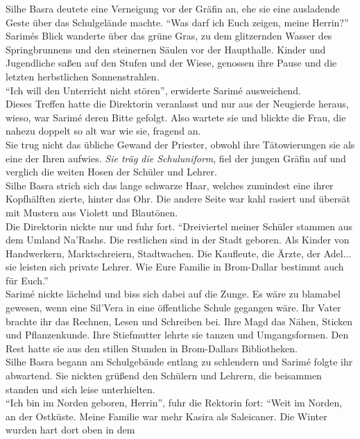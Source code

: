 Silhe Basra deutete eine Verneigung vor der Gräfin an, ehe sie eine ausladende Geste über das 
Schulgelände machte. ``Was darf ich Euch zeigen, meine Herrin?''\\
Sarimés Blick wanderte über das grüne Gras, zu dem glitzernden Wasser des Springbrunnens und den 
steinernen Säulen vor der Haupthalle. Kinder und Jugendliche saßen auf den Stufen und der Wiese, 
genossen ihre Pause und die letzten herbstlichen Sonnenstrahlen.\\
``Ich will den Unterricht nicht stören'', erwiderte Sarimé ausweichend.\\
Dieses Treffen hatte die Direktorin veranlasst und nur aus der Neugierde heraus, wieso, war Sarimé 
deren Bitte gefolgt. Also wartete sie und blickte die Frau, die nahezu doppelt so alt war wie sie, 
fragend an.\\
Sie trug nicht das übliche Gewand der Priester, obwohl ihre Tätowierungen sie als eine der Ihren 
aufwies. \textit{Sie träg die Schuluniform}, fiel der jungen Gräfin auf und verglich die weiten 
Hosen der Schüler und Lehrer.\\
Silhe Basra strich sich das lange schwarze Haar, welches zumindest eine ihrer Kopfhälften zierte, 
hinter das Ohr. Die andere Seite war kahl rasiert und übersät mit Mustern aus Violett und 
Blautönen.\\
Die Direktorin nickte nur und fuhr fort. ``Dreiviertel meiner Schüler stammen aus dem Umland 
Na'Rashs. Die restlichen sind in der Stadt geboren. Als Kinder von Handwerkern, Marktschreiern, 
Stadtwachen. Die Kaufleute, die Ärzte, der Adel... sie leisten sich private Lehrer. Wie Eure 
Familie in Brom-Dallar bestimmt auch für Euch.''\\
Sarimé nickte lächelnd und biss sich dabei auf die Zunge. Es wäre zu blamabel gewesen, wenn eine 
Sil'Vera in eine öffentliche Schule gegangen wäre. Ihr Vater brachte ihr das Rechnen, Lesen und 
Schreiben bei. Ihre Magd das Nähen, Sticken und Pflanzenkunde. Ihre Stiefmutter lehrte sie 
tanzen und Umgangsformen. Den Rest hatte sie aus den stillen Stunden in Brom-Dallars Bibliotheken.\\
Silhe Basra begann am Schulgebäude entlang zu schlendern und Sarimé folgte ihr abwartend. Sie 
nickten grüßend den Schülern und Lehrern, die beisammen standen und sich leise unterhielten.\\
``Ich bin im Norden geboren, Herrin'', fuhr die Rektorin fort: ``Weit im Norden, an der Ostküste. 
Meine Familie war mehr Kasira als Saleicaner. Die Winter wurden hart dort oben in dem 
